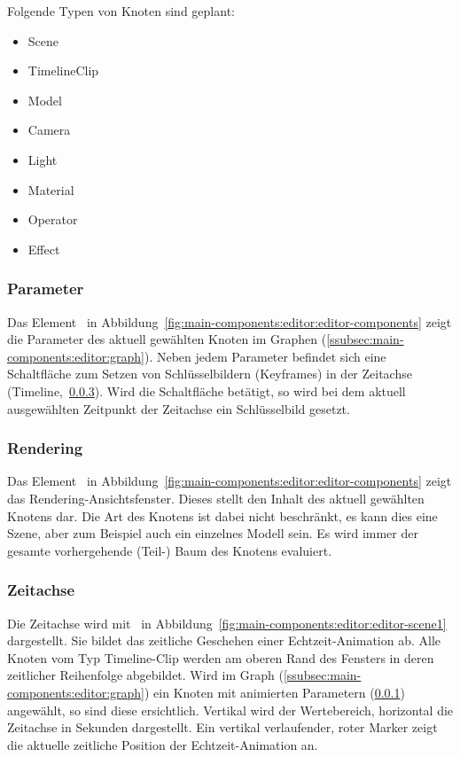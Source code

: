 Folgende Typen von Knoten sind geplant:
\begin{itemize}
    \item{Scene}
    \item{TimelineClip}
    \item{Model}
    \item{Camera}
    \item{Light}
    \item{Material}
    \item{Operator}
    \item{Effect}
\end{itemize}

\subsubsection{Parameter}
\label{ssubsec:main-components:editor:parameters}

Das Element~ in
Abbildung~\ref{fig:main-components:editor:editor-components} zeigt die Parameter
des aktuell gewählten Knoten im Graphen
(\ref{ssubsec:main-components:editor:graph}). Neben jedem Parameter befindet
sich eine Schaltfläche zum Setzen von Schlüsselbildern (Keyframes) in der
Zeitachse (Timeline,~\ref{ssubsec:main-components:editor:timeline}). Wird die
Schaltfläche betätigt, so wird bei dem aktuell ausgewählten Zeitpunkt der
Zeitachse ein Schlüsselbild gesetzt.

\subsubsection{Rendering}
\label{ssubsec:main-components:editor:rendering}

Das Element~ in
Abbildung~\ref{fig:main-components:editor:editor-components} zeigt das
Rendering-Ansichtsfenster. Dieses stellt den Inhalt des aktuell gewählten
Knotens dar. Die Art des Knotens ist dabei nicht beschränkt, es kann dies eine
Szene, aber zum Beispiel auch ein einzelnes Modell sein. Es wird immer der
gesamte vorhergehende (Teil-) Baum des Knotens evaluiert.

\subsubsection{Zeitachse}
\label{ssubsec:main-components:editor:timeline}

Die Zeitachse wird mit~ in
Abbildung~\ref{fig:main-components:editor:editor-scene1} dargestellt.  Sie
bildet das zeitliche Geschehen einer Echtzeit-Animation ab. Alle Knoten vom Typ
Timeline-Clip werden am oberen Rand des Fensters in deren zeitlicher
Reihenfolge abgebildet. Wird im Graph
(\ref{ssubsec:main-components:editor:graph}) ein Knoten mit animierten
Parametern (\ref{ssubsec:main-components:editor:parameters}) angewählt, so sind
diese ersichtlich. Vertikal wird der Wertebereich, horizontal die Zeitachse in
Sekunden dargestellt. Ein vertikal verlaufender, roter Marker zeigt die aktuelle
zeitliche Position der Echtzeit-Animation an.

